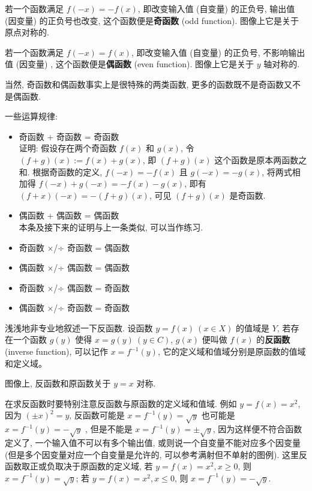 \begin{tcolorbox}[size=fbox, breakable, enhanced jigsaw, title={奇偶性 (parity 大嘘)}]

若一个函数满足 $f(-x)=-f(x)$, 即改变输入值 (自变量) 的正负号, 输出值
(因变量) 的正负号也改变, 这个函数便是\textbf{奇函数} (odd function).
图像上它是关于原点对称的.

若一个函数满足 $f(-x)=f(x)$, 即改变输入值 (自变量) 的正负号,
不影响输出值 (因变量) , 这个函数便是\textbf{偶函数} (even function).
图像上它是关于 $y$ 轴对称的.

当然, 奇函数和偶函数事实上是很特殊的两类函数,
更多的函数既不是奇函数又不是偶函数.

一些运算规律:

\begin{itemize}

\item
  奇函数 + 奇函数 = 奇函数\\{\kaishu 证明}: 假设存在两个奇函数 $f(x)$ 和
  $g(x)$, 令 $(f+g)(x) := f(x) + g(x)$, 即 $(f+g)(x)$
  这个函数是原本两函数之和. 根据奇函数的定义, $f(-x)=-f(x)$ 且
  $g(-x)=-g(x)$, 将两式相加得 $f(-x)+g(-x)=-f(x)-g(x)$, 即有
  $(f+x)(-x)=-(f+g)(x)$, 可见 $(f+g)(x)$ 是奇函数.
\item
  偶函数 + 偶函数 = 偶函数\\本条及接下来的证明与上一条类似, 可以当作练习.
\item
  奇函数 ×/÷ 奇函数 = 偶函数
\item
  偶函数 ×/÷ 偶函数 = 偶函数
\item
  奇函数 ×/÷ 偶函数 = 奇函数
\item
  偶函数 ×/÷ 奇函数 = 奇函数
\end{itemize}

\end{tcolorbox}

\begin{tcolorbox}[size=fbox, breakable, enhanced jigsaw, title={反函数 (inverse
function)}]

浅浅地非专业地叙述一下反函数. 设函数 $y=f(x)\ (x\in X)$ 的值域是
$Y$, 若存在一个函数 $g(y)$ 使得 $x= g(y)\ (y\in C)$, $g(x)$
便叫做 $f(x)$ 的\textbf{反函数} (inverse function), 可以记作
$x=f^{-1}(y)$, 它的定义域和值域分别是原函数的值域和定义域。

图像上, 反函数和原函数关于 $y=x$ 对称.

在求反函数时要特别注意反函数与原函数的定义域和值域. 例如 $y=f(x)=x^2$,
因为 $(\pm x)^2=y$, 反函数可能是 $x=f^{-1}(y)=\sqrt{y}$ 也可能是
$x=f^{-1}(y)=-\sqrt{y}$ , 但是不能是 $x=f^{-1}(y)=\pm\sqrt{y}$,
因为这样便不符合函数定义了, 一个输入值不可以有多个输出值,
或则说一个自变量不能对应多个因变量
(但是多个因变量对应一个自变量是允许的, 可以参考满射但不单射的图例).
这里反函数取正或负取决于原函数的定义域, 若 $y=f(x)=x^2, x\ge 0$, 则
$x=f^{-1}(y)=\sqrt{y}$; 若 $y=f(x)=x^2, x\le 0$, 则
$x=f^{-1}(y)=-\sqrt{y}$.

\end{tcolorbox}

